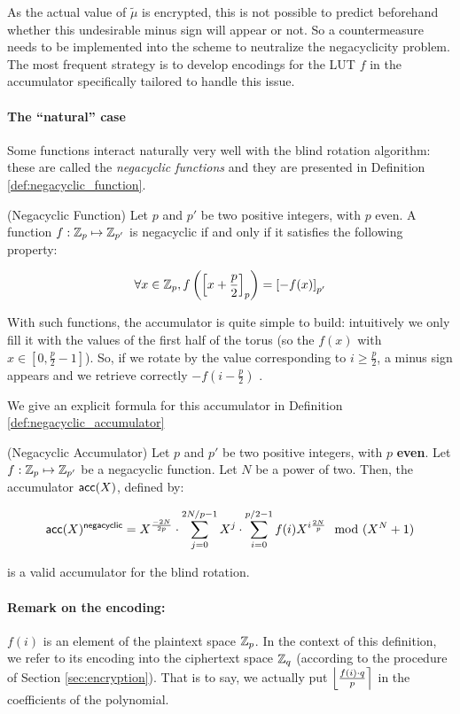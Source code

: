 As the actual value of $\tilde{\mu}$ is encrypted, this is not possible to predict beforehand whether this undesirable minus sign will appear or not. So a countermeasure needs to be implemented into the scheme to neutralize the negacyclicity problem. The most frequent strategy is to develop encodings for the LUT $f$ in the accumulator specifically tailored to handle this issue.


\paragraph{The ``natural'' case}

Some functions interact naturally very well with the blind rotation algorithm: these are called the \textit{negacyclic functions} and they are presented in Definition \ref{def:negacyclic_function}.


\begin{definition} (Negacyclic Function)
	Let $p$ and $p'$ be two positive integers, with $p$ even. A function $f : \mathbb{Z}_p \mapsto \mathbb{Z}_{p'}$ is negacyclic if and only if it satisfies the following property:
	
	\[
		\forall x \in \mathbb{Z}_p, f\left (\left [ x + \frac p 2 \right ]_{p} \right ) = \left [ -f(x) \right ]_{p'}
	\]
	
	\label{def:negacyclic_function}
\end{definition}


With such functions, the accumulator is quite simple to build: intuitively we only fill it with the values of the first half of the torus (so the $f(x)$ with $x \in \left [0, \frac p 2 - 1 \right ]$). So, if we rotate by the value corresponding to $i \ge \frac p 2$, a minus sign appears and we retrieve correctly $-f\left(i - \frac p 2 \right)$ .

We give an explicit formula for this accumulator in Definition \ref{def:negacyclic_accumulator}

\begin{definition} (Negacyclic Accumulator)
		\label{def:negacyclic_accumulator}
		Let $p$ and $p'$ be two positive integers, with $p$ \textbf{even}. Let $f:\mathbb{Z}_p \mapsto \mathbb{Z}_{p'}$ be a negacyclic function. Let $N$ be a power of two. Then, the accumulator $\textsf{acc}(X)$, defined by:
	
	\[
		\textsf{acc}(X)^{\textsf{negacyclic}} = X^{\frac{-2N}{2p}} \cdot \sum_{j=0}^{2N / p - 1} X^j \cdot \sum_{i=0}^{p/2 - 1} f(i) X^{i \frac{2N}{p}} \mod (X^N + 1)
	\]
	
	is a valid accumulator for the blind rotation.
	
	\paragraph{Remark on the encoding:}
	$f(i)$ is an element of the plaintext space $\mathbb{Z}_p$. In the context of this definition, we refer to its encoding into the ciphertext space $\mathbb{Z}_q$ (according to the procedure of Section \ref{sec:encryption}). That is to say, we actually put $\left \lfloor \frac{f(i) \cdot q}{p} \right \rceil$ in the coefficients of the polynomial.
\end{definition}



